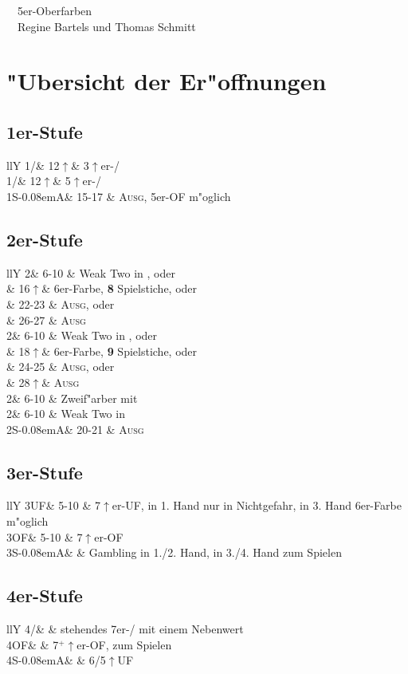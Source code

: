 \documentclass[11pt,german,twocolumn]{scrartcl}
\def\pik{\nobreak\hspace{\cardskip}\Sp\xspace}
\def\coe{\nobreak\hspace{\cardskip}\He\xspace}
\def\kar{\nobreak\hspace{\cardskip}\Di\xspace}
\def\tre{\nobreak\hspace{\cardskip}\Cl\xspace}
\def\pi{\Sp\xspace}
\def\co{\He\xspace}
\def\ka{\Di\xspace}
\def\tr{\Cl\xspace}
\def\mi{\hspace{\cardskip}\Cl{}/\Di\xspace}
\def\ma{\hspace{\cardskip}\He{}/\Sp\xspace}
\def\good{$^+$\xspace}
\def\pl{$\uparrow$\xspace}
\def\uf{\nobreak\hspace{\cardskip}\textsf{UF}\xspace}
\def\of{\nobreak\hspace{\cardskip}\textsf{OF}\xspace}
\def\ufa{\nobreak\textsf{UF}\xspace}
\def\ofa{\nobreak\textsf{OF}\xspace}
\def\sa{\nobreak\textsf{S\kern-0.08emA}\xspace}
\def\SA{\nobreak\hspace{\cardskip}\sa}
\def\bal{\textsc{Ausg}\xspace}
\newcommand\bidins[1]%
{%
\begin{flushleft}
\begin{tabularx}{\columnwidth}{llY}%
#1
\end{tabularx}%
\end{flushleft}
}
\begin{document}
\setlength{\itemsep}{0ex plus0.2ex}

\begin{center}
\textsf{{\co{}~~5er-Oberfarben~~\pi\\[1ex]}
\tr{}~~Regine Bartels und Thomas Schmitt~~\ka}
\end{center}
\tableofcontents

\newpage
\section{"Ubersicht der Er"offnungen}

\subsection*{1er-Stufe}
\bidins{%
1\mi & 12\pl	& 3\pl{}er-\mi\\[1ex]
1\ma & 12\pl	& 5\pl{}er-\ma\\[1ex]
1\SA & 15-17	& \bal, 5er-\ofa m"oglich
}

\subsection*{2er-Stufe}
\bidins{%
2\tre	& 6-10	& Weak Two in \ka, oder\\
	& 16\pl	& 6er-Farbe, \textbf{8} Spielstiche, oder\\
	& 22-23	& \bal, oder\\
	& 26-27	& \bal\\[1ex]
2\kar	& 6-10	& Weak Two in \co, oder\\
	& 18\pl	& 6er-Farbe, \textbf{9} Spielstiche, oder\\
	& 24-25	& \bal, oder\\
	& 28\pl	& \bal\\[1ex]
2\coe	& 6-10	& Zweif"arber mit \co\\[1ex]
2\pik	& 6-10	& Weak Two in \pi\\[1ex]
2\SA	& 20-21	& \bal
}

\subsection*{3er-Stufe}
\bidins{%
3\uf	& 5-10	& 7\pl{}er-\ufa, in 1. Hand nur in Nichtgefahr, in 3. Hand 6er-Farbe m"oglich\\[1ex]
3\of	& 5-10	& 7\pl{}er-\ofa\\[1ex]
3\SA	& 	& Gambling in 1./2. Hand, in 3./4. Hand zum Spielen
}

\subsection*{4er-Stufe}
\bidins{%
4\mi	& 	& stehendes 7er-\ma mit einem Nebenwert\\[1ex]
4\of	&	& 7\good{}\pl{}er-\ofa, zum Spielen\\[1ex]
4\SA	&	& 6/5\pl\uf
}
\end{document}
